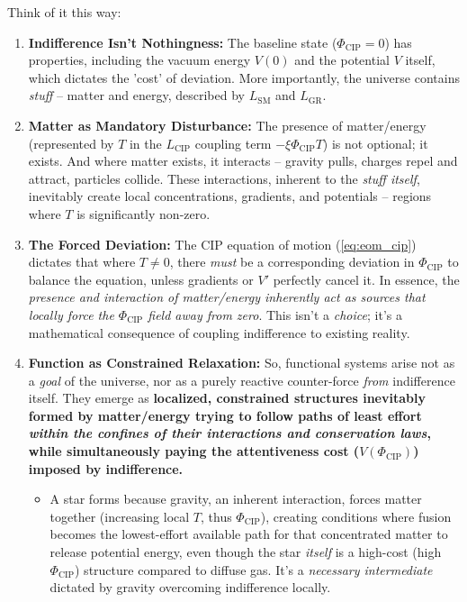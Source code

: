\documentclass[11pt, a4paper]{article}
\newcommand{\subt}[1]{\mathrm{#1}}
\begin{document}
Think of it this way:
\begin{enumerate}
    \item \textbf{Indifference Isn't Nothingness:} The baseline state ($\Phi_{\subt{CIP}}=0$) has properties, including the vacuum energy $V(0)$ and the potential $V$ itself, which dictates the 'cost' of deviation. More importantly, the universe contains \textit{stuff} – matter and energy, described by $L_{\subt{SM}}$ and $L_{\subt{GR}}$.
    \item \textbf{Matter as Mandatory Disturbance:} The presence of matter/energy (represented by $T$ in the $L_{\subt{CIP}}$ coupling term $-\xi\Phi_{\subt{CIP}}T$) is not optional; it exists. And where matter exists, it interacts – gravity pulls, charges repel and attract, particles collide. These interactions, inherent to the \textit{stuff itself}, inevitably create local concentrations, gradients, and potentials – regions where $T$ is significantly non-zero.
    \item \textbf{The Forced Deviation:} The CIP equation of motion (\ref{eq:eom_cip}) dictates that where $T \neq 0$, there \textit{must} be a corresponding deviation in $\Phi_{\subt{CIP}}$ to balance the equation, unless gradients or $V'$ perfectly cancel it. In essence, the \textit{presence and interaction of matter/energy inherently act as sources that locally force the $\Phi_{\subt{CIP}}$ field away from zero}. This isn't a \textit{choice}; it's a mathematical consequence of coupling indifference to existing reality.
    \item \textbf{Function as Constrained Relaxation:} So, functional systems arise not as a \textit{goal} of the universe, nor as a purely reactive counter-force \textit{from} indifference itself. They emerge as \textbf{localized, constrained structures inevitably formed by matter/energy trying to follow paths of least effort \textit{within the confines of their interactions and conservation laws}, while simultaneously paying the attentiveness cost ($V(\Phi_{\subt{CIP}})$) imposed by indifference.}
    \begin{itemize}
        \item A star forms because gravity, an inherent interaction, forces matter together (increasing local $T$, thus $\Phi_{\subt{CIP}}$), creating conditions where fusion becomes the lowest-effort available path for that concentrated matter to release potential energy, even though the star \textit{itself} is a high-cost (high $\Phi_{\subt{CIP}}$) structure compared to diffuse gas. It's a \textit{necessary intermediate} dictated by gravity overcoming indifference locally.

\end{itemize}
\end{enumerate}
\end{document}
